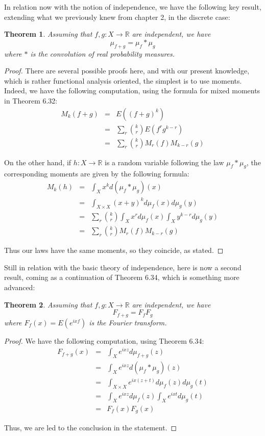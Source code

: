 \documentclass[12pt]{amsbook}
\newtheorem{theorem}{Theorem}[chapter]
\begin{document}
In relation now with the notion of independence, we have the following key result, extending what we previously knew from chapter 2, in the discrete case:

\begin{theorem}
Assuming that $f,g:X\to\mathbb R$ are independent, we have
$$\mu_{f+g}=\mu_f*\mu_g$$
where $*$ is the convolution of real probability measures.
\end{theorem}

\begin{proof}
There are several possible proofs here, and with our present knowledge, which is rather functional analysis oriented, the simplest is to use moments. Indeed, we have the following computation, using the formula for mixed moments in Theorem 6.32:
\begin{eqnarray*}
M_k(f+g)
&=&E((f+g)^k)\\
&=&\sum_r\binom{k}{r}E(f^rg^{k-r})\\
&=&\sum_r\binom{k}{r}M_r(f)M_{k-r}(g)
\end{eqnarray*}

On the other hand, if $h:X\to\mathbb R$ is a random variable following the law $\mu_f*\mu_g$, the corresponding moments are given by the following formula:
\begin{eqnarray*}
M_k(h)
&=&\int_Xx^kd(\mu_f*\mu_g)(x)\\
&=&\int_{X\times X}(x+y)^kd\mu_f(x)d\mu_g(y)\\
&=&\sum_r\binom{k}{r}\int_Xx^rd\mu_f(x)\int_Xy^{k-r}d\mu_g(y)\\
&=&\sum_r\binom{k}{r}M_r(f)M_{k-r}(g)
\end{eqnarray*}

Thus our laws have the same moments, so they coincide, as stated.
\end{proof}

Still in relation with the basic theory of independence, here is now a second result, coming as a continuation of Theorem 6.34, which is something more advanced:


\begin{theorem}
Assuming that $f,g:X\to\mathbb R$ are independent, we have
$$F_{f+g}=F_fF_g$$
where $F_f(x)=E(e^{ixf})$ is the Fourier transform.
\end{theorem}

\begin{proof}
We have the following computation, using Theorem 6.34:
\begin{eqnarray*}
F_{f+g}(x)
&=&\int_Xe^{ixz}d\mu_{f+g}(z)\\
&=&\int_Xe^{ixz}d(\mu_f*\mu_g)(z)\\
&=&\int_{X\times X}e^{ix(z+t)}d\mu_f(z)d\mu_g(t)\\
&=&\int_Xe^{ixz}d\mu_f(z)\int_Xe^{ixt}d\mu_g(t)\\
&=&F_f(x)F_g(x)
\end{eqnarray*}

Thus, we are led to the conclusion in the statement.
\end{proof}
\end{document}
